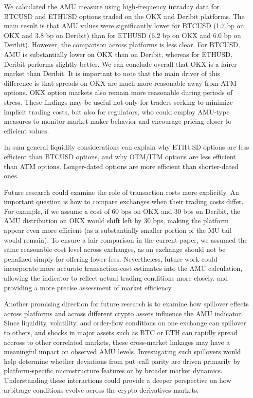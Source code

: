 \documentclass[12pt]{article}
\begin{document}
We calculated the AMU measure using high‑frequency intraday data for BTCUSD and ETHUSD options traded on the OKX and Deribit platforms. The main result is that AMU values were significantly lower for BTCUSD (1.7 bp on OKX and 3.8 bp on Deribit) than for ETHUSD (6.2 bp on OKX and 6.0 bp on Deribit). However, the comparison across platforms is less clear. For BTCUSD, AMU is substantially lower on OKX than on Deribit, whereas for ETHUSD, Deribit performs slightly better. We can conclude overall that OKX is a fairer market than Deribit. It is important to note that the main driver of this difference is that spreads on OKX are much more reasonable away from ATM options. OKX option markets also remain more reasonable during periods of stress. These findings may be useful not only for traders seeking to minimize implicit trading costs, but also for regulators, who could employ AMU‑type measures to monitor market‑maker behavior and encourage pricing closer to efficient values. 

In sum general liquidity considerations can explain why ETHUSD options are less efficient than BTCUSD options, and why OTM/ITM options are less efficient than ATM options. Longer-dated options are more efficient than shorter-dated ones. 

Future research could examine the role of transaction costs more explicitly. An important question is how to compare exchanges when their trading costs differ. For example, if we assume a cost of 60 bps on OKX and 30 bps on Deribit, the AMU distribution on OKX would shift left by 30 bps, making the platform appear even more efficient (as a substantially smaller portion of the MU tail would remain). To ensure a fair comparison in the current paper, we assumed the same reasonable cost level across exchanges, as an exchange should not be penalized simply for offering lower fees. Nevertheless, future work could incorporate more accurate transaction‑cost estimates into the AMU calculation, allowing the indicator to reflect actual trading conditions more closely, and providing a more precise assessment of market efficiency.

Another promising direction for future research is to examine how spillover effects across platforms and across different crypto assets influence the AMU indicator. Since liquidity, volatility, and order‑flow conditions on one exchange can spillover to others, and shocks in major assets such as BTC or ETH can rapidly spread accross to other correlated markets, these cross‑market linkages may have a meaningful impact on observed AMU levels. Investigating such spillovers would help determine whether deviations from put–call parity are driven primarily by platform‑specific microstructure features or by broader market dynamics. Understanding these interactions could provide a deeper perspective on how arbitrage conditions evolve across the crypto derivatives markets.
\end{document}
